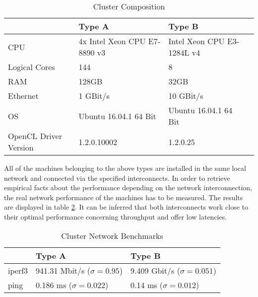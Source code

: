 \begin{table}[!htb]
	\centering
	\begin{adjustbox}{width=0.7\textwidth}
		\small
		\begin{tabular}{l | l | l | l}
			~                     & Type A                  	& Type B                  \\
			\hline
			CPU                   &  4x Intel Xeon CPU E7-8890 v3 	& Intel Xeon CPU E3-1284L v4 \\
			Logical Cores         &  144 	& 8 \\
			RAM                   &  128GB                       	& 32GB                       \\
			Ethernet	          &  1 GBit/s                  	& 10 GBit/s                  \\
			OS                    &  Ubuntu 16.04.1 64 Bit      	& Ubuntu 16.04.1 64 Bit      \\
			OpenCL Driver Version &  1.2.0.10002                   & 1.2.0.25                   \\
		\end{tabular}
	\end{adjustbox}

	\caption{Cluster Composition}
	\label{table:cluster_setup_1}
\end{table}

All of the machines belonging to the above types are installed in the same local network and connected via the specified interconnects. In order to retrieve empirical facts about the performance depending on the network interconnection, the real network performance of the machines has to be measured. The results are displayed in table \ref{table:cluster_interconnect_benchmarks}. It can be inferred that both interconnects work close to their optimal performance concerning throughput and offer low latencies.

\begin{table}[!htb]
	\centering
	\begin{adjustbox}{width=0.5\textwidth}
		\small
		\begin{tabular}{l | l | l}
			~                     & Type A                 			& Type B                  \\
			\hline
			iperf3                & 941.31 Mbit/s ($\sigma = 0.95$) 	& 9.409 Gbit/s ($\sigma = 0.051$) \\
			ping                  & 0.186 ms ($\sigma = 0.022$)  		& 0.14 ms ($\sigma = 0.012$)  \\
		\end{tabular}
	\end{adjustbox}

	\caption{Cluster Network Benchmarks}
	\label{table:cluster_interconnect_benchmarks}
\end{table}

